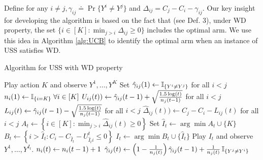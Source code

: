 Define for any $i\neq j, \gamma_{ij}\doteq \Pr\{Y^i\neq Y^j\}$ and $\Delta_{ij}=C_j-C_i -\gamma_{ij}$. Our key insight for developing the algorithm is based on the fact that (see Def. 3),
under WD property, the set $\{i \in [K]: \min_{j> i}\Delta_{ij}\geq 0\}$ includes the optimal arm. We use this idea in Algorithm \ref{alg:UCB} to identify the optimal arm when an instance of USS satisfies WD. 

\begin{center}
\begin{minipage}{0.48\textwidth}
		\begin{algorithm}[H]
			\caption{Algorithm for USS with WD property} %
			\label{alg:UCB}
			\begin{algorithmic}[1]
				\State Play action $K$ and observe $Y^1,\dots,Y^K$
				\State Set $\hat{\gamma}_{ij}(1) \leftarrow \mathbb{I}_{\{Y^i\ne Y^j\}}$ for all $i< j$
				\State $n_i(1)\leftarrow \mathbb{I}_{\{i=K\}} \; \forall i\in [K]$
				\State $U_{ij}(t))\leftarrow\hat{\gamma}_{ij}(t-1) + \sqrt{\frac{1.5\log(t)}{n_j(t-1)}}$  for all $i< j$ \label{algo:UCB}
				\State $L_{ij}(t)\leftarrow\hat{\gamma}_{ij}(t-1) - \sqrt{\frac{1.5\log(t)}{n_j(t-1)}}$  for all $i< j$ \label{algo:LCB}
				\State $\hat{\Delta}_{ij}(t))\leftarrow C_j-C_i-L_{ij}(t)$ for all $i< j$
				\State $A_t \leftarrow \left \{i \in [K]:\displaystyle \min_{j> i}\hat{\Delta}_{ij}(t)\geq 0 \right\}$ \label{algo:sort}
				\State Set $\hat{I}_t\leftarrow \arg \min A_t\cup \{K\} $
				\State $B_t \leftarrow \left\{i>\hat{I}_t: C_i- C_{\hat{I}_t}-U_{\hat{I}_t i}^t \leq 0\right \}$
				\State $I_t\leftarrow \arg\min B_t\cup \{\hat{I}_t\}$
				\State Play $I_t$ and observe $Y^1,\dots,Y^{I_t}$.
				 \State $n_i(t) \leftarrow n_i(t-1)+1$
				 \State \hspace{-1cm}$\hat{\gamma}_{ij}(t) \leftarrow \left (1-\frac{1}{n_j(t)}\right )
				 \hat{\gamma}_{ij}(t-1) + \frac{1}{n_j(t)} \,\mathbb{I}_{\{Y^j\ne Y^i\}}$ 
				\EndFor
				\EndFor
				\EndFor
			\end{algorithmic}
		\end{algorithm}
	\end{minipage}
\end{center}

